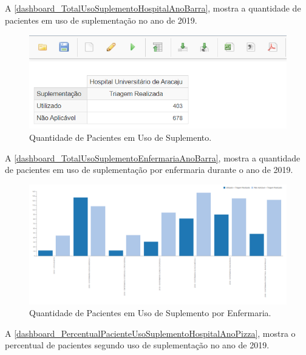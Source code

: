 \newpage
A \autoref{dashboard_TotalUsoSuplementoHospitalAnoBarra}, mostra a quantidade de pacientes em uso de suplementação no ano de 2019.

\begin{figure}[htb]
	\caption{\label{dashboard_TotalUsoSuplementoHospitalAnoBarra}Quantidade de Pacientes em Uso de Suplemento.}
	\begin{center}
	    \includegraphics[scale=0.7]{Imagens/5.1.TotalUsoSuplementoHospitalAnoBarra.png}
	\end{center}
\end{figure}

A \autoref{dashboard_TotalUsoSuplementoEnfermariaAnoBarra}, mostra a quantidade de pacientes em uso de suplementação por enfermaria durante o ano de 2019.

\begin{figure}[htb]
	\caption{\label{dashboard_TotalUsoSuplementoEnfermariaAnoBarra}Quantidade de Pacientes em Uso de Suplemento por Enfermaria.}
	\begin{center}
	    \includegraphics[scale=0.55]{Imagens/5.2.TotalUsoSuplementoEnfermariaAnoBarra.png}
	\end{center}
\end{figure}

\newpage
A \autoref{dashboard_PercentualPacienteUsoSuplementoHospitalAnoPizza}, mostra o percentual de pacientes segundo uso de suplementação no ano de 2019.

